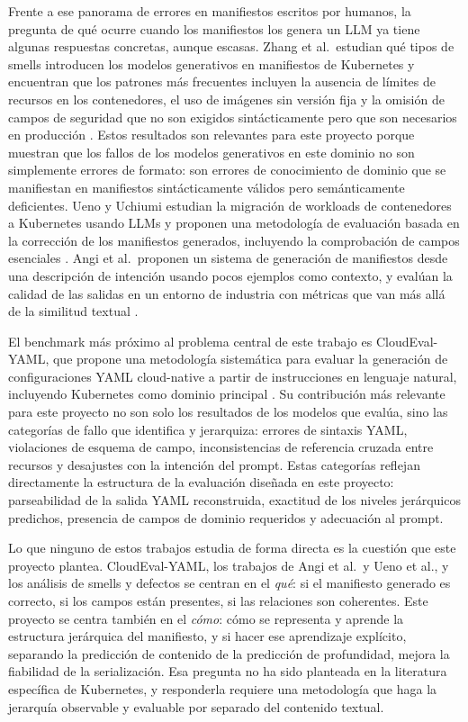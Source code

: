 Frente a ese panorama de errores en manifiestos escritos por humanos, la pregunta de qué ocurre cuando los manifiestos los genera un LLM ya tiene algunas respuestas concretas, aunque escasas. Zhang et al.\ estudian qué tipos de smells introducen los modelos generativos en manifiestos de Kubernetes y encuentran que los patrones más frecuentes incluyen la ausencia de límites de recursos en los contenedores, el uso de imágenes sin versión fija y la omisión de campos de seguridad que no son exigidos sintácticamente pero que son necesarios en producción \citep{zhang2024generativeSmells}. Estos resultados son relevantes para este proyecto porque muestran que los fallos de los modelos generativos en este dominio no son simplemente errores de formato: son errores de conocimiento de dominio que se manifiestan en manifiestos sintácticamente válidos pero semánticamente deficientes. Ueno y Uchiumi estudian la migración de workloads de contenedores a Kubernetes usando LLMs y proponen una metodología de evaluación basada en la corrección de los manifiestos generados, incluyendo la comprobación de campos esenciales \citep{ueno2024migrating}. Angi et al.\ proponen un sistema de generación de manifiestos desde una descripción de intención usando pocos ejemplos como contexto, y evalúan la calidad de las salidas en un entorno de industria con métricas que van más allá de la similitud textual \citep{angi2025kgen}.

El benchmark más próximo al problema central de este trabajo es CloudEval-YAML, que propone una metodología sistemática para evaluar la generación de configuraciones YAML cloud-native a partir de instrucciones en lenguaje natural, incluyendo Kubernetes como dominio principal \citep{xu2024cloudevalyaml}. Su contribución más relevante para este proyecto no son solo los resultados de los modelos que evalúa, sino las categorías de fallo que identifica y jerarquiza: errores de sintaxis YAML, violaciones de esquema de campo, inconsistencias de referencia cruzada entre recursos y desajustes con la intención del prompt. Estas categorías reflejan directamente la estructura de la evaluación diseñada en este proyecto: parseabilidad de la salida YAML reconstruida, exactitud de los niveles jerárquicos predichos, presencia de campos de dominio requeridos y adecuación al prompt.

Lo que ninguno de estos trabajos estudia de forma directa es la cuestión que este proyecto plantea. CloudEval-YAML, los trabajos de Angi et al.\ y Ueno et al., y los análisis de smells y defectos se centran en el \textit{qué}: si el manifiesto generado es correcto, si los campos están presentes, si las relaciones son coherentes. Este proyecto se centra también en el \textit{cómo}: cómo se representa y aprende la estructura jerárquica del manifiesto, y si hacer ese aprendizaje explícito, separando la predicción de contenido de la predicción de profundidad, mejora la fiabilidad de la serialización. Esa pregunta no ha sido planteada en la literatura específica de Kubernetes, y responderla requiere una metodología que haga la jerarquía observable y evaluable por separado del contenido textual.

